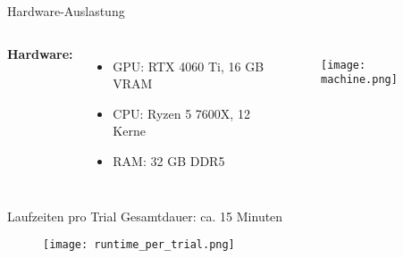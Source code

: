 \begin{frame}{Hardware-Auslastung}
\begin{columns}[T,onlytextwidth]

    \textbf{Hardware:}
    \begin{itemize}
        \item GPU: RTX 4060 Ti, 16 GB VRAM
        \item CPU: Ryzen 5 7600X, 12 Kerne
        \item RAM: 32 GB DDR5
    \end{itemize}

    \begin{figure}
        \centering
        \texttt{[image: machine.png]}
    \end{figure}

\end{columns}
\end{frame}


\begin{frame}{Laufzeiten pro Trial}
Gesamtdauer: ca. 15 Minuten

\begin{figure}
    \centering
    \texttt{[image: runtime\_per\_trial.png]}
\end{figure}
\end{frame}
